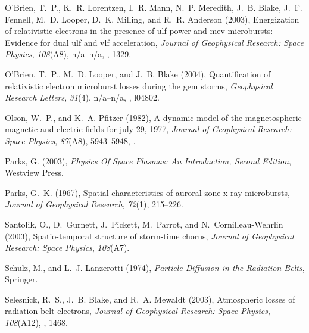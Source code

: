 \documentclass[draft, linenumbers]{agujournal}
\begin{document}
\begin{thebibliography}{35}
O'Brien, T.~P., K.~R. Lorentzen, I.~R. Mann, N.~P. Meredith, J.~B. Blake, J.~F.
  Fennell, M.~D. Looper, D.~K. Milling, and R.~R. Anderson (2003), Energization
  of relativistic electrons in the presence of ulf power and mev microbursts:
  Evidence for dual ulf and vlf acceleration, \textit{Journal of Geophysical
  Research: Space Physics}, \textit{108}(A8), n/a--n/a,
  , 1329.

O'Brien, T.~P., M.~D. Looper, and J.~B. Blake (2004), Quantification of
  relativistic electron microburst losses during the gem storms,
  \textit{Geophysical Research Letters}, \textit{31}(4), n/a--n/a,
  , l04802.

Olson, W.~P., and K.~A. Pfitzer (1982), A dynamic model of the magnetospheric
  magnetic and electric fields for july 29, 1977, \textit{Journal of
  Geophysical Research: Space Physics}, \textit{87}(A8), 5943--5948,
  .

Parks, G. (2003), \textit{Physics Of Space Plasmas: An Introduction, Second
  Edition}, Westview Press.

Parks, G.~K. (1967), Spatial characteristics of auroral-zone x-ray microbursts,
  \textit{Journal of Geophysical Research}, \textit{72}(1), 215--226.

Santolik, O., D.~Gurnett, J.~Pickett, M.~Parrot, and N.~Cornilleau-Wehrlin
  (2003), Spatio-temporal structure of storm-time chorus, \textit{Journal of
  Geophysical Research: Space Physics}, \textit{108}(A7).

Schulz, M., and L.~J. Lanzerotti (1974), \textit{Particle Diffusion in the
  Radiation Belts}, Springer.

Selesnick, R.~S., J.~B. Blake, and R.~A. Mewaldt (2003), Atmospheric losses of
  radiation belt electrons, \textit{Journal of Geophysical Research: Space
  Physics}, \textit{108}(A12), , 1468.


\end{thebibliography}
\end{document}
